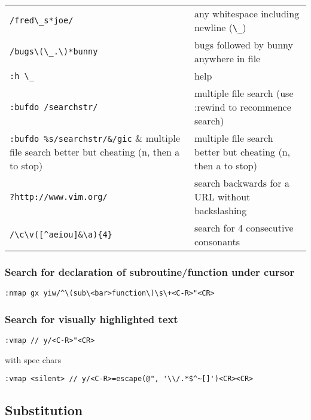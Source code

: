 \begin{center}
\begin{longtable}{l|l}
\verb!/fred\_s*joe/! & any whitespace including newline (\verb!\_!) \\
\verb!/bugs\(\_.\)*bunny! & bugs followed by bunny anywhere in file\\
\verb!:h \_! & help\\
\verb!:bufdo /searchstr/! & multiple file search (use :rewind to recommence search) \\
\verb!:bufdo %s/searchstr/&/gic! & multiple file search better but cheating (n, then a to stop) \\
\verb!?http://www.vim.org/! & search backwards for a URL without backslashing\\
\verb!/\c\v([^aeiou]&\a){4}! & search for 4 consecutive consonants
\end{longtable}
\end{center}

\subsubsection{Search for declaration of subroutine/function under cursor}
\begin{verbatim}
:nmap gx yiw/^\(sub\<bar>function\)\s\+<C-R>"<CR>
\end{verbatim}

\subsubsection{Search for visually highlighted text}
\begin{verbatim}
:vmap // y/<C-R>"<CR>
\end{verbatim}

with spec chars
\begin{verbatim}
:vmap <silent> // y/<C-R>=escape(@", '\\/.*$^~[]')<CR><CR>
\end{verbatim}

\subsection{Substitution}

